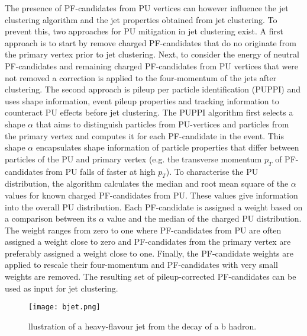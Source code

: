 The presence of PF-candidates from PU vertices can however influence the jet clustering algorithm and the jet properties obtained from jet clustering. To prevent this, two approaches for PU mitigation in jet clustering exist. A first approach is to start by remove charged PF-candidates that do no originate from the primary vertex prior to jet clustering. Next, to consider the energy of neutral PF-candidates and remaining charged PF-candidates from PU vertices that were not removed a correction is applied to the four-momentum of the jets after clustering. The second approach is pileup per particle identification (PUPPI)\cite{Bertolini_2014} and uses shape information, event pileup properties and tracking information to counteract PU effects before jet clustering. The PUPPI algorithm first selects a shape $\alpha$ that aims to distinguish particles from PU-vertices and particles from the primary vertex and computes it for each PF-candidate in the event. This shape $\alpha$ encapsulates shape information of particle properties that differ between particles of the PU and primary vertex (e.g. the transverse momentum $p_T$ of PF-candidates from PU falls of faster at high $p_T$). To characterise the PU distribution, the algorithm calculates the median and root mean square of the $\alpha$ values for known charged PF-candidates from PU. These values give information into the overall PU distribution. Each PF-candidate is assigned a weight based on a comparison between its $\alpha$ value and the median of the charged PU distribution. The weight ranges from zero to one where PF-candidates from PU are often assigned a weight close to zero and PF-candidates from the primary vertex are preferably assigned a weight close to one. Finally, the PF-candidate weights are applied to rescale their four-momentum and PF-candidates with very small weights are removed. The resulting set of pileup-corrected PF-candidates can be used as input for jet clustering. \\
\begin{wrapfigure}{r}{0.55\textwidth}
    \texttt{[image: bjet.png]}
    \caption{llustration of a heavy-flavour jet from the decay of a b hadron.\cite{Sirunyan_2018}}
    \label{Fig:Bjet}
\end{wrapfigure}
\\
